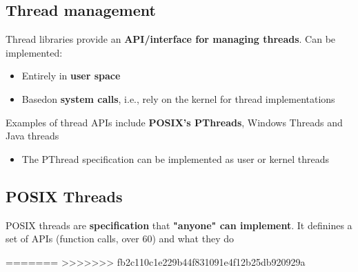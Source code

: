 \documentclass{article}
\begin{document}
\subsection{Thread management}
\begin{flushleft}
Thread libraries provide an \textbf{API/interface for managing threads}. Can be implemented:
\begin{itemize}
	\item Entirely in \textbf{user space}
	\item Basedon \textbf{system calls}, i.e., rely on the kernel for thread implementations
\end{itemize}
Examples of thread APIs include \textbf{POSIX's PThreads}, Windows Threads and Java threads
\begin{itemize}
	\item The PThread specification can be implemented as user or kernel threads
\end{itemize}
\end{flushleft}

\subsection{POSIX Threads}
\begin{flushleft}
	POSIX threads are \textbf{specification} that \textbf{"anyone" can implement}. It definines a set of APIs (function calls, over 60) and what they do
\end{flushleft}
=======
>>>>>>> fb2c110c1e229b44f831091e4f12b25db920929a
\end{document}
